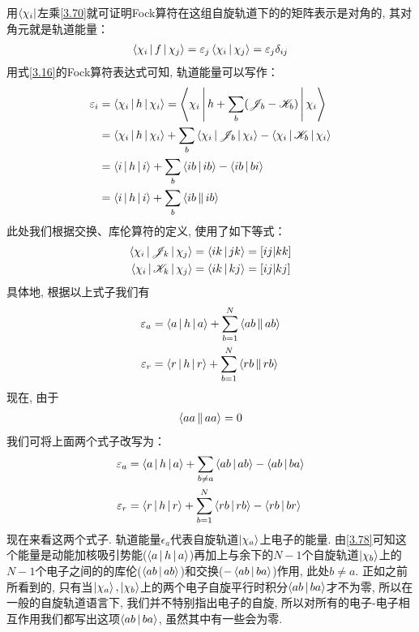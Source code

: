 用$\Bra{\chi_i}$左乘\eqref{3.70}就可证明Fock算符在这组自旋轨道下的的矩阵表示是对角的, 
其对角元就是轨道能量：
\begin{align}
	\Braket{\chi_i|f|\chi_j} = \varepsilon_j\Braket{\chi_i|\chi_j} = \varepsilon_j\delta_{ij}
\end{align}
用式\eqref{3.16}的Fock算符表达式可知, 
轨道能量可以写作：
\begin{align}
	\varepsilon_i & = \Braket{\chi_i|h|\chi_i} = \Braket{\chi_i|h+\sum_b(\mathscr{J}_b-\mathscr{K}_b)|\chi_i}\notag\\
	& = \Braket{\chi_i|h|\chi_i} + \sum_b\Braket{\chi_i|\mathscr{J}_b|\chi_i} - \Braket{\chi_i|\mathscr{K}_b|\chi_i}\notag\\
	& = \Braket{i|h|i} + \sum_b\Braket{ib|ib} - \Braket{ib|bi}\notag\\
	& = \Braket{i|h|i} + \sum_b\Braket{ib||ib}
	\label{3.72}
\end{align}
此处我们根据交换、库伦算符的定义, 
使用了如下等式：
\begin{align}
	\Braket{\chi_i|\mathscr{J}_k|\chi_j} & = \Braket{ik|jk} = [ij|kk]\\
	\Braket{\chi_i|\mathscr{K}_k|\chi_j} & = \Braket{ik|kj} = [ij|kj]
\end{align}
具体地, 
根据以上式子我们有
\begin{align}
	\label{3.75}
	\varepsilon_a & = \Braket{a|h|a} + \sum_{b=1}^{N}\Braket{ab||ab}\\
	\varepsilon_r & = \Braket{r|h|r} + \sum_{b=1}^{N}\Braket{rb||rb}
	\label{3.76}
\end{align}
现在, 
由于
\begin{align}
	\Braket{aa||aa} = 0
\end{align}
我们可将上面两个式子改写为：
\begin{align}
	\label{3.78}
	\varepsilon_a & = \Braket{a|h|a} + \sum_{b\neq a}\Braket{ab|ab} - \Braket{ab|ba}\\
	\varepsilon_r & = \Braket{r|h|r} + \sum_{b=1}^{N}\Braket{rb|rb} - \Braket{rb|br}
	\label{3.79}
\end{align}
现在来看这两个式子. 
轨道能量$\epsilon_a$代表自旋轨道$\Ket{\chi_a}$上电子的能量. 
由\eqref{3.78}可知这个能量是动能加核吸引势能($\Braket{a|h|a}$)再加上与余下的$N-1$个自旋轨道$\Ket{\chi_b}$上的$N-1$个电子之间的的库伦($\Braket{ab|ab}$)和交换($-\Braket{ab|ba}$)作用, 
此处$b \neq a$. 
正如之前所看到的, 
只有当$\Ket{\chi_a},\Ket{\chi_b}$上的两个电子自旋平行时积分$\Braket{ab|ba}$才不为零, 
所以在一般的自旋轨道语言下, 
我们并不特别指出电子的自旋, 
所以对所有的电子-电子相互作用我们都写出这项$\Braket{ab|ba}$, 
虽然其中有一些会为零.



